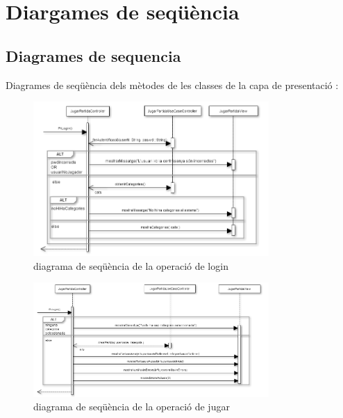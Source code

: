 
\section{Diargames de seqüència}

\subsection{Diagrames de sequencia}
Diagrames de seqüència dels mètodes de les classes de la capa de presentació : 

    \begin{figure}[h]
    \centering
    \includegraphics[width=0.8\textwidth]{images/prLogin.png}
    \caption{diagrama de seqüència de la operació de login}
    \end{figure}
    
    \begin{figure}[h]
    \centering
    \includegraphics[width=0.8\textwidth]{images/prJugar.png}
    \caption{diagrama de seqüència de la operació de jugar}
    \end{figure}
    
